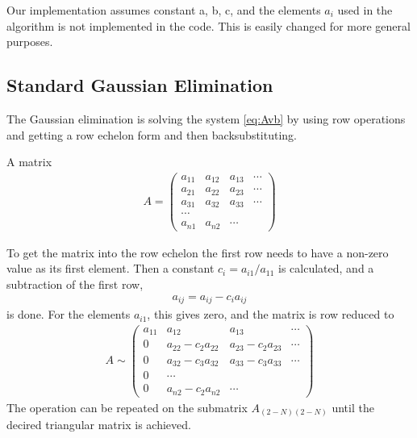 \documentclass[11pt,a4paper,english,final]{article}
\numberwithin{equation}{section}
\begin{document}
Our implementation assumes constant a, b, c, and the elements $a_i$
used in the algorithm is not implemented in the code. This is 
easily changed for more general purposes.

\subsection{Standard Gaussian Elimination}

The Gaussian elimination is solving the system \eqref{eq:Avb} by using 
row operations and getting a row echelon form and then backsubstituting.

A matrix
\begin{gather}
A = \begin{pmatrix}
    a_{11} & a_{12} & a_{13} & \cdots\\
    a_{21} & a_{22} & a_{23} & \cdots\\
    a_{31} & a_{32} & a_{33} & \cdots\\
    \cdots \\
    a_{n1} & a_{n2} & \cdots
    \end{pmatrix}
\end{gather}

To get the matrix into the row echelon the first row needs to have a non-zero
value as its first element. Then a constant $c_i = a_{i1}/a_{11}$ is 
calculated, and a subtraction of the first row,
\begin{gather}
a_{ij} = a_{ij} - c_i a_{ij}
\end{gather}
is done. For the elements $a_{i1}$, this gives zero, and the matrix is
row reduced to
\begin{gather}
A \sim
\begin{pmatrix}
    a_{11} & a_{12} & a_{13} & \cdots\\
    0 & a_{22} - c_2 a_{22} & a_{23} - c_2 a_{23} & \cdots\\
    0 & a_{32} - c_3 a_{32} & a_{33} - c_3 a_{33} & \cdots\\
    0 & \cdots \\
    0 & a_{n2} - c_2 a_{n2} & \cdots
\end{pmatrix}
\end{gather}
The operation can be repeated on the submatrix $A_{(2-N)(2-N)}$
until the decired triangular matrix is achieved.
\end{document}
